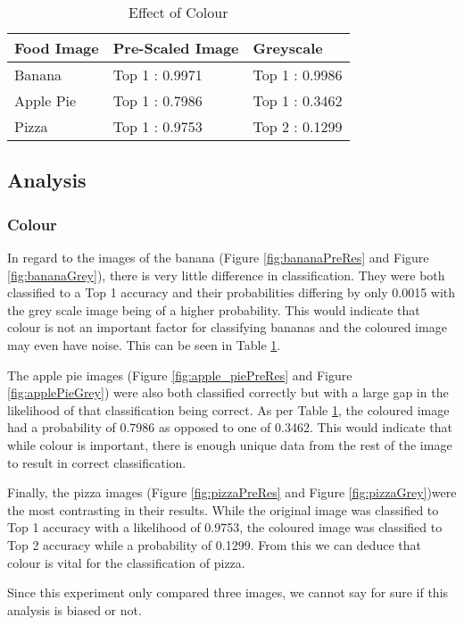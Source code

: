 \begin{table}[]
\centering
\caption{Effect of Colour}
\label{colour}
\begin{tabular}{|l|l|l|}
\hline
\textbf{Food Image} & \textbf{Pre-Scaled Image} & \textbf{Greyscale}      \\ \hline
Banana     & Top 1 : 0.9971   & Top 1 : 0.9986 \\ \hline
Apple Pie  & Top 1 : 0.7986   & Top 1 : 0.3462   \\ \hline
Pizza      & Top 1 : 0.9753   & Top 2 : 0.1299 \\ \hline
\end{tabular}
\end{table}

\tocless\subsection{Analysis}
\tocless\subsubsection{Colour}
In regard to the images of the banana (Figure \ref{fig:bananaPreRes} and Figure \ref{fig:bananaGrey}), there is very little difference in classification. They were both classified to a Top 1 accuracy and their probabilities differing by only 0.0015 with the grey scale image being of a higher probability. This would indicate that colour is not an important factor for classifying bananas and the coloured image may even have noise. This can be seen in Table \ref{colour}.

The apple pie images (Figure \ref{fig:apple_piePreRes} and Figure \ref{fig:applePieGrey}) were also both classified correctly but with a large gap in the likelihood of that classification being correct. As per Table \ref{colour}, the coloured image had a probability of 0.7986 as opposed to one of 0.3462. This would indicate that while colour is important, there is enough unique data from the rest of the image to result in correct classification.

Finally, the pizza images (Figure \ref{fig:pizzaPreRes} and Figure \ref{fig:pizzaGrey})were the most contrasting in their results. While the original image was classified to Top 1 accuracy with a likelihood of 0.9753, the coloured image was classified to Top 2 accuracy while a probability of 0.1299. From this we can deduce that colour is vital for the classification of pizza.

Since this experiment only compared three images, we cannot say for sure if this analysis is biased or not.

